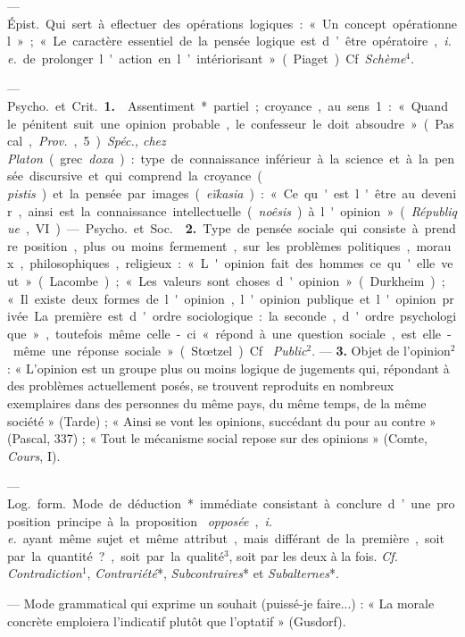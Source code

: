 \begin{itemize}[leftmargin=1cm, label=, itemsep=1pt]
 — \si{Épist.} Qui sert à eflectuer des
opérations logiques : « Un concept opérationnel » ; « Le caractère essentiel
de la pensée logique est d’être opératoire, {\it i. e.} de prolonger l'action
en l’intériorisant » (Piaget). Cf. {\it Schème}$^4$.

 — \si{Psycho.} et \si{Crit.} {\bf 1.} 
Assentiment* partiel ; croyance, au sens 1 : « Quand le pénitent suit une
opinion probable, le confesseur le doit absoudre » (Pascal, {\it Prov.}, 5).
{\it Spéc., chez Platon} (grec {\it doxa}) : type de connaissance inférieur à
la science et à la pensée discursive et qui comprend la croyance ({\it
pistis}) et la pensée par images ({\it eïkasia}) : « Ce qu'est l'être au
devenir, ainsi est la connaissance intellectuelle ({\it noêsis}) à l'opinion
» ({\it République}, VI).

— \si{Psycho.} et \si{Soc.}  {\bf 2.} Type de
pensée sociale qui consiste à prendre position, plus ou moins fermement, sur
les problèmes politiques, moraux, philosophiques, religieux : « L'opinion
fait des hommes ce qu'elle veut » (Lacombe) ; « Les valeurs sont choses
d'opinion » (Durkheim) ; « Il existe deux formes de l'opinion, l'opinion
publique et l'opinion privée. La première est d'ordre sociologique: ... la
seconde, d'ordre psychologique », toutefois même celle-ci « répond à une
question sociale, est elle-même une réponse sociale » (Stœtzel). Cf. {\it
Public}$^2$. —  {\bf 3.} Objet de l'opinion$^2$ : « L'opinion
est un groupe plus ou moins logique de jugements qui, répondant à des
problèmes actuellement posés, se trouvent reproduits en nombreux exemplaires
dans des personnes du même pays, du même temps, de la même société
» (Tarde) ; « Ainsi se vont les opinions, succédant du pour au contre
» (Pascal, 337) ; « Tout le mécanisme social repose sur des opinions
» (Comte, {\it Cours}, I).

 — \si{Log.} \si{form.} Mode de déduction* immédiate
consistant à conclure d’une proposition principe à la proposition {\it
opposée}, {\it i. e.} ayant même sujet et même attribut, mais différant de la
première, soit par la quantité?, soit par la qualité$^3$, soit par les deux à
la fois. {\it Cf.} {\it Contradiction}$^1$, {\it Contrariété}*, {\it
Subcontraires}* et {\it Subalternes}*.

 — Mode grammatical qui exprime un souhait (puissé-je faire...) :
« La morale concrète emploiera l'indicatif plutôt que l’optatif » (Gusdorf).


\end{itemize}
